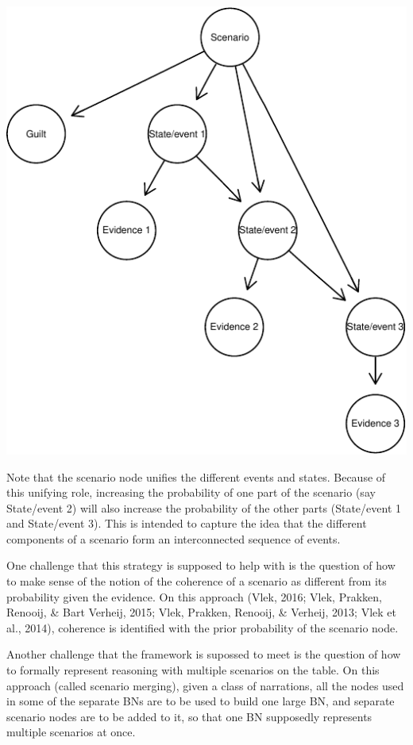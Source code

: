 \documentclass[11pt,dvipsnames,enabledeprecatedfontcommands]{scrartcl}
\begin{document}
\begin{center}\includegraphics{BNfiles/unnamed-chunk-13-1} \end{center}

\noindent
 Note that the scenario node unifies the different events and states.
Because of this unifying role, increasing the probability of one part of
the scenario (say \textsf{State/event 2}) will also increase the
probability of the other parts (\textsf{State/event 1} and
\textsf{State/event 3}). This is intended to capture the idea that the
different components of a scenario form an interconnected sequence of
events.

One challenge that this strategy is supposed to help with is the
question of how to make sense of the notion of the coherence of a
scenario as different from its probability given the evidence. On this
approach (Vlek, 2016; Vlek, Prakken, Renooij, \& Bart Verheij, 2015;
Vlek, Prakken, Renooij, \& Verheij, 2013; Vlek et al., 2014), coherence
is identified with the prior probability of the scenario node.

Another challenge that the framework is supossed to meet is the question
of how to formally represent reasoning with multiple scenarios on the
table. On this approach (called scenario merging), given a class of
narrations, all the nodes used in some of the separate BNs are to be
used to build one large BN, and separate scenario nodes are to be added
to it, so that one BN supposedly represents multiple scenarios at once.
\end{document}
